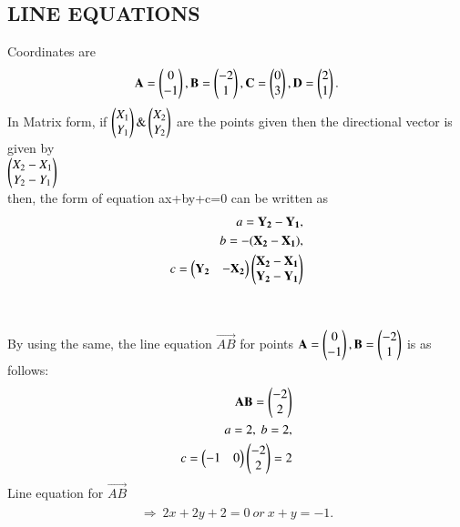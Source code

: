 \documentclass[journal,12pt,twocolumn]{IEEEtran}
\begin{document}
\subsection{LINE EQUATIONS}
Coordinates are
\\
\begin{align}
\begin{split}
\mathbf{A} = \begin{pmatrix}0 \\ -1\end{pmatrix},
\mathbf{B} =\begin{pmatrix}-2\\1\end{pmatrix} ,
\mathbf{C} = \begin{pmatrix}0 \\ 3\end{pmatrix},
\mathbf{D} =\begin{pmatrix}2\\1\end{pmatrix}.
\end{split}
\end{align}
In Matrix form, if $\begin{pmatrix}X_1\\Y_1\end{pmatrix} \&  \begin{pmatrix}X_2\\Y_2\end{pmatrix}$ are the points given then the directional vector is given by \\$\begin{pmatrix}X_2-X_1\\ Y_2-Y_1\end{pmatrix}$ \\then, 
the form of equation ax+by+c=0 can be written as\\ 
\begin{align}
\begin{split}
a= \mathbf{Y_2-Y_1},\\ b=-(\mathbf{X_2-X_1}),\\ c = \begin{pmatrix}\mathbf{Y_2}&-\mathbf{X_2}\end{pmatrix} \begin{pmatrix}\mathbf{X_2-X_1}\\\mathbf{ Y_2-Y_1}\end{pmatrix}
\end{split}
\end{align}
\\
\\
By using the same, the line equation $\vec{AB}$ for points $\mathbf{A} = \begin{pmatrix}0\\-1\end{pmatrix},\mathbf{B}=\begin{pmatrix}-2\\1\end{pmatrix}$ is as follows:
\\
\begin{align}
\begin{split}
\mathbf{AB} = \begin{pmatrix}-2\\2\end{pmatrix}\\
a=2,\ b=2,\\
c=\begin{pmatrix}-1 & 0\end{pmatrix} \begin{pmatrix}-2\\2\end{pmatrix}=2\\
\end{split}
\end{align}
Line equation for $\vec{AB}$
\begin{align}
\begin{split}
\Rightarrow\ 2x+2y+2=0 \ or \ x+y=-1. \\
\end{split}
\end{align}
\end{document}
